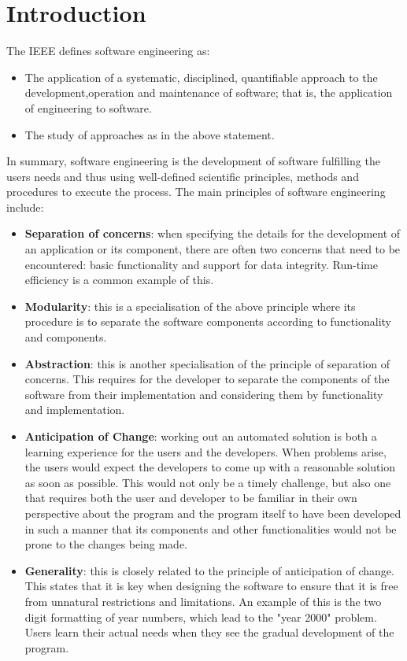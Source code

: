 \documentclass[a4paper]{article}
\begin{document}
{\section{Introduction}
The IEEE defines software engineering as:
\begin{itemize}
    \item The application of a systematic, disciplined, quantifiable approach to the development,operation and maintenance of software; that is, the application of engineering to software.
    \item The study of approaches as in the above statement.\autocite{R01}
\end{itemize}
In summary, software engineering is the development of software fulfilling the users needs and thus using well-defined scientific principles, methods and procedures to execute the process.
\bigbreak
The main principles of software engineering include:
\begin{itemize}
    \item \textbf{Separation of concerns}: when specifying the details for the development of an application or its component, there are often two concerns that need to be encountered: basic functionality and support for data integrity. Run-time efficiency is a common example of this.
    \item \textbf{Modularity}: this is a specialisation of the above principle where its procedure is to separate the software components according to functionality and components.
    \item \textbf{Abstraction}:  this is another specialisation of the principle of separation of concerns. This requires for the developer to separate the components of the software from their implementation and considering them by functionality and implementation.
    \item \textbf{Anticipation of Change}: working out an automated solution is both a learning experience for the users and the developers. When problems arise, the users would expect the developers to come up with a reasonable solution as soon as possible. This would not only be a timely challenge, but also one that requires both the user and developer to be familiar in their own perspective about the program and the program itself to have been developed in such a manner that its components and other functionalities would not be prone to the changes being made.
    \item \textbf{Generality}: this is closely related to the principle of anticipation of change. This states that it is key when designing the software to ensure that it is free from unnatural restrictions and limitations. An example of this is the two digit formatting of year numbers, which lead to the "year 2000" problem. Users learn their actual needs when they see the gradual development of the program.

\end{itemize}}
\end{document}
